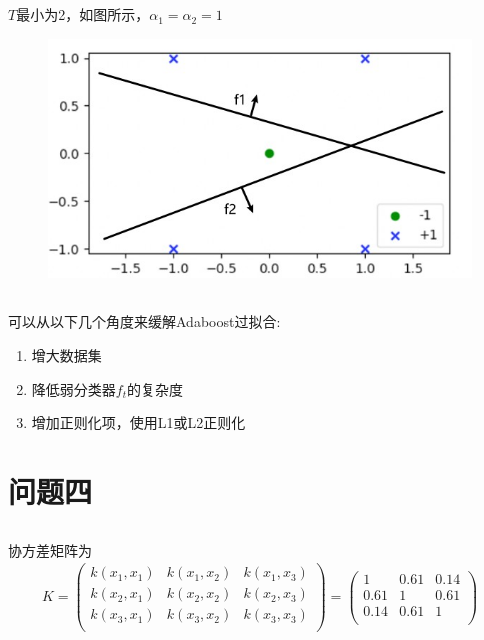 \documentclass[12pt, a4paper]{article}
\begin{document}
\subsection{}

$T$最小为2，如图所示，$\alpha_1=\alpha_2=1$

\begin{figure}
    \centering
    \includegraphics{img/a4_1.jpg}
\end{figure}

\subsection{}

可以从以下几个角度来缓解Adaboost过拟合:
\begin{enumerate}
    \item 增大数据集
    \item 降低弱分类器$f_t$的复杂度
    \item 增加正则化项，使用L1或L2正则化
\end{enumerate}

\section{问题四}

\subsection{}

协方差矩阵为
\begin{align*}
    K=\begin{pmatrix}
        k(x_1,x_1)&k(x_1,x_2)&k(x_1,x_3)\\
        k(x_2,x_1)&k(x_2,x_2)&k(x_2,x_3)\\
        k(x_3,x_1)&k(x_3,x_2)&k(x_3,x_3)\\
    \end{pmatrix}
    =\begin{pmatrix}
        1 & 0.61 & 0.14 \\
        0.61 & 1 & 0.61 \\
        0.14 & 0.61 & 1\\
    \end{pmatrix}
\end{align*}
\end{document}
